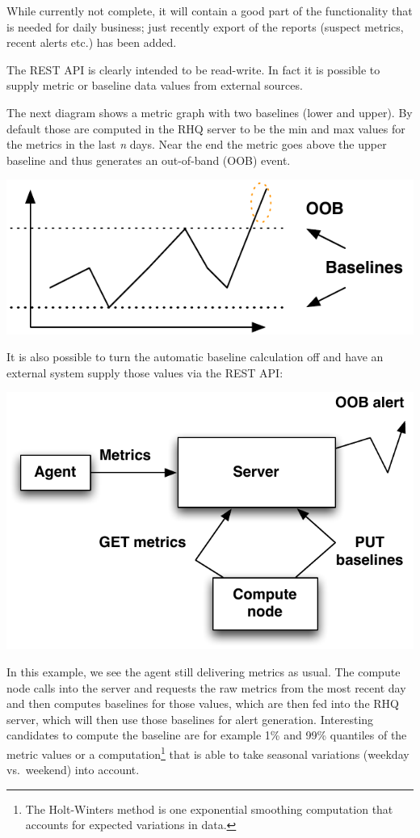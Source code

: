 \documentclass[twocolumn,10pt,a4paper]{article}
\begin{document}
While currently not complete, it will contain a good part of the functionality
that is needed for daily business; just recently export of the reports (suspect metrics, recent alerts etc.) has been added. 

The REST API is clearly intended to be read-write. In fact it is possible to supply metric or baseline data values from external sources. 

The next diagram shows a metric graph with two baselines (lower and upper). By default those are computed in the RHQ server to be the min and max values for the metrics in the last \emph{n} days. Near the end the metric goes above the upper baseline and thus generates an out-of-band (OOB) event.

\noindent\includegraphics[width=\columnwidth]{graph/baseline_graph.pdf}

It is also possible to turn the automatic baseline calculation off and have an external system supply those values via the REST API:

\noindent\includegraphics[width=\columnwidth]{graph/ext_baseline.pdf}

In this example, we see the agent still delivering metrics as usual. The compute node calls into the server and requests the raw metrics from the most recent day and then computes baselines for those values, which are then fed into the RHQ server, which will then use those baselines for alert generation. Interesting candidates to compute the baseline are for example 1\% and 99\% quantiles of the metric values or a computation\footnote{The Holt-Winters method is one exponential smoothing computation that accounts for expected variations in data.} that is able to take seasonal variations (weekday vs.\ weekend) into account.
\end{document}
